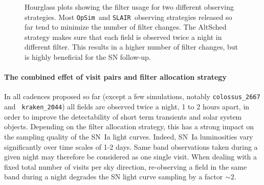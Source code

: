 \documentclass [11pt,a4paper]{article}
\newcommand{\opsim}{{\tt OpSim\ }}
\newcommand{\slair}{{\tt SLAIR\ }}
\begin{document}
\begin{figure}
  \begin{center}
    \caption{Hourglass plots showing the filter usage for two
      different observing strategies. Most \opsim and \slair observing
      strategies released so far tend to minimize the number of filter
      changes. The AltSched strategy makes sure that each field is
      observed twice a night in different filter. This results in a
      higher number of filter changes, but is highly beneficial for
      the SN follow-up. }
    \label{fig:hourglass_plot_filter_alloc}
  \end{center}
\end{figure}

\paragraph{The combined effet of visit pairs and filter allocation strategy} In all cadences proposed so far
(except a few simulations, notably {\tt colossus\_2667} and {\tt
  kraken\_2044}) all fields are observed twice a night, 1 to 2 hours
apart, in order to improve the detectability of short term transients
and solar system objects.  Depending on the filter allocation
strategy, this has a strong impact on the sampling quality of the
SN~Ia light curves.  Indeed, SN~Ia luminosities vary significantly
over time scales of 1-2 days.  Same band observations taken during a
given night may therefore be considered as one single visit. When
dealing with a fixed total number of visits per sky direction,
re-observing a field in the same band during a night degrades the SN
light curve sampling by a factor $\sim 2$.
\end{document}
